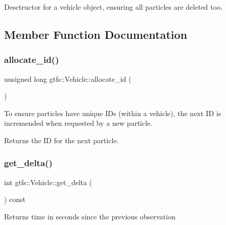 Desctructor for a vehicle object, ensuring all particles are deleted too. 

\subsection{Member Function Documentation}
\mbox{\label{classgtfs_1_1Vehicle_aa9087e973a9821f384ec47f51bdcedc7}} 
\subsubsection{\texorpdfstring{allocate\+\_\+id()}{allocate\_id()}}
{\footnotesize\ttfamily unsigned long gtfs\+::\+Vehicle\+::allocate\+\_\+id (\begin{DoxyParamCaption}{ }\end{DoxyParamCaption})}

To ensure particles have unique ID\textquotesingle{}s (within a vehicle), the next ID is incremended when requested by a new particle.

\begin{DoxyReturn}{Returns}
the ID for the next particle. 
\end{DoxyReturn}
\mbox{\label{classgtfs_1_1Vehicle_a23c0a191559e4066423d5f3cbfb70b46}} 
\subsubsection{\texorpdfstring{get\+\_\+delta()}{get\_delta()}}
{\footnotesize\ttfamily int gtfs\+::\+Vehicle\+::get\+\_\+delta (\begin{DoxyParamCaption}{ }\end{DoxyParamCaption}) const}

\begin{DoxyReturn}{Returns}
time in seconds since the previous observation 
\end{DoxyReturn}
\mbox{\label{classgtfs_1_1Vehicle_a6b388986c9ed4af1eb86f13a3d2de8e0}} 
